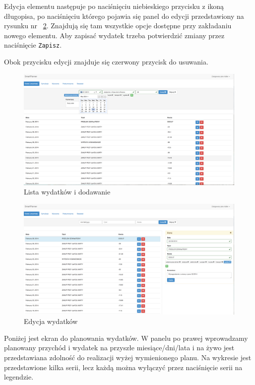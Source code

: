 \documentclass[10pt,titlepage]{article}
\begin{document}
\par Edycja elementu następuje po naciśnięciu niebieskiego przycisku z ikoną długopisa, po naciśnięciu którego pojawia się panel do edycji przedstawiony na rysunku nr ~\ref{screen:editExpense}. Znajdują się tam wszystkie opcje dostępne przy zakładaniu nowego elementu. Aby zapisać wydatek trzeba potwierdzić zmiany przez naciśnięcie \verb|Zapisz|.
\par Obok przycisku edycji znajduje się czerwony przycisk do usuwania.
\begin{figure}[H]
  \centering
  \includegraphics[scale=0.2]{images/screen_dodawaniewydatkow.png}
  \caption{Lista wydatków i dodawanie}
  \label{screen:listExpense}
\end{figure}
\begin{figure}[H]
  \centering
  \includegraphics[scale=0.2]{images/screen_edycjaWydatku.png}
  \caption{Edycja wydatków}
  \label{screen:editExpense}
\end{figure}
\par Poniżej jest ekran do planowania wydatków. W panelu po prawej wprowadzamy planowany przychód i wydatek na przyszłe miesiące/dni/lata i na żywo jest przedstawiana zdolność do realizacji wyżej wymienionego planu. Na wykresie jest przedstawione kilka serii, lecz każdą można wyłączyć przez naciśnięcie serii na legendzie.
\end{document}
